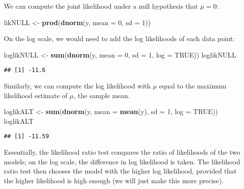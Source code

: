 \documentclass[12pt,]{krantz}
\newenvironment{Shaded}{\begin{snugshade}}{\end{snugshade}}
\newcommand{\DataTypeTok}[1]{\textcolor[rgb]{0.13,0.29,0.53}{#1}}
\newcommand{\DecValTok}[1]{\textcolor[rgb]{0.00,0.00,0.81}{#1}}
\newcommand{\KeywordTok}[1]{\textcolor[rgb]{0.13,0.29,0.53}{\textbf{#1}}}
\newcommand{\NormalTok}[1]{#1}
\newcommand{\OtherTok}[1]{\textcolor[rgb]{0.56,0.35,0.01}{#1}}
\newcommand{\StringTok}[1]{\textcolor[rgb]{0.31,0.60,0.02}{#1}}
\begin{document}
We can compute the joint likelihood under a null hypothesis that \(\mu=0\):

\begin{Shaded}
\begin{Highlighting}[]
\NormalTok{likNULL <-}\StringTok{ }\KeywordTok{prod}\NormalTok{(}\KeywordTok{dnorm}\NormalTok{(y, }\DataTypeTok{mean =} \DecValTok{0}\NormalTok{, }\DataTypeTok{sd =} \DecValTok{1}\NormalTok{))}
\end{Highlighting}
\end{Shaded}

On the log scale, we would need to add the log likelihoods of each data point:

\begin{Shaded}
\begin{Highlighting}[]
\NormalTok{loglikNULL <-}\StringTok{ }\KeywordTok{sum}\NormalTok{(}\KeywordTok{dnorm}\NormalTok{(y, }\DataTypeTok{mean =} \DecValTok{0}\NormalTok{, }\DataTypeTok{sd =} \DecValTok{1}\NormalTok{, }
  \DataTypeTok{log =} \OtherTok{TRUE}\NormalTok{))}
\NormalTok{loglikNULL}
\end{Highlighting}
\end{Shaded}

\begin{verbatim}
## [1] -11.6
\end{verbatim}

Similarly, we can compute the log likelihood with \(\mu\) equal to the maximum likelihood estimate of \(\mu\), the sample mean.

\begin{Shaded}
\begin{Highlighting}[]
\NormalTok{loglikALT <-}\StringTok{ }\KeywordTok{sum}\NormalTok{(}\KeywordTok{dnorm}\NormalTok{(y, }\DataTypeTok{mean =} \KeywordTok{mean}\NormalTok{(y), }
  \DataTypeTok{sd =} \DecValTok{1}\NormalTok{, }\DataTypeTok{log =} \OtherTok{TRUE}\NormalTok{))}
\NormalTok{loglikALT}
\end{Highlighting}
\end{Shaded}

\begin{verbatim}
## [1] -11.59
\end{verbatim}

Essentially, the likelihood ratio test compares the ratio of likelihoods of the two models; on the log scale, the difference in log likelihood is taken.
The likelihood ratio test then chooses the model with the higher log likelihood, provided that the higher likelihood is high enough (we will just make this more precise).
\end{document}
